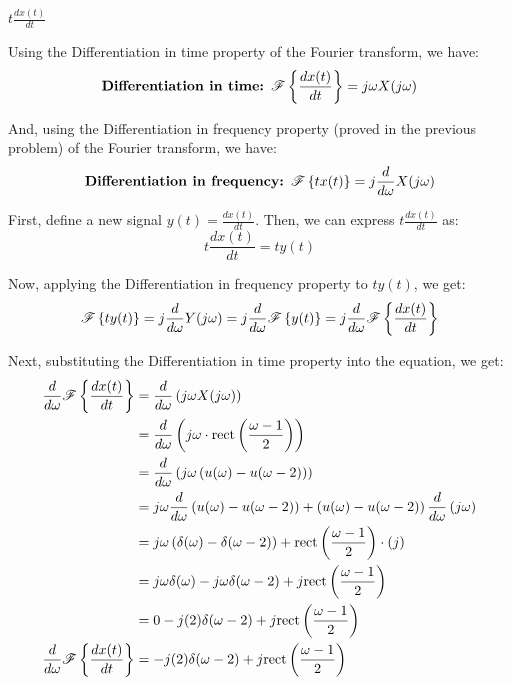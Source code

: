 \documentclass[a4paper, 10pt]{article}
\begin{document}
\newpage

\begin{tosubmit}
\begin{subproblems}[start=3]
    \item \( t \frac{d x(t)}{dt} \)
\end{subproblems}

\par\noindent\submitsolution
Using the Differentiation in time property of the Fourier transform, we have:
\[
    \textbf{Differentiation in time: } \mathscr{F} \left\{ \frac{d x(t)}{dt} \right\} = j\omega X(j\omega)
\]

And, using the Differentiation in frequency property (proved in the previous problem) of the Fourier transform, we have:
\[
    \textbf{Differentiation in frequency: } \mathscr{F} \left\{ t x(t) \right\} = j \frac{d}{d\omega} X(j\omega)
\]

First, define a new signal \( y(t) = \frac{d x(t)}{dt} \). Then, we can express \( t \frac{d x(t)}{dt} \) as:
\[
    t \frac{d x(t)}{dt} = t y(t)
\]

Now, applying the Differentiation in frequency property to \( t y(t) \), we get:
\[
    \mathscr{F} \left\{ t y(t) \right\} = j \frac{d}{d\omega} Y(j\omega) = j \frac{d}{d\omega} \mathscr{F} \left\{ y(t) \right\} = j \frac{d}{d\omega} \mathscr{F} \left\{ \frac{d x(t)}{dt} \right\}
\]

Next, substituting the Differentiation in time property into the equation, we get:
\begin{align*}  
    \frac{d}{d\omega} \mathscr{F} \left\{ \frac{d x(t)}{dt} \right\} &= \frac{d}{d\omega} \left( j\omega X(j\omega) \right) \\
    &= \frac{d}{d\omega} \left( j\omega \cdot \textrm{rect} \left( \frac{\omega - 1}{2} \right) \right) \\
    &= \frac{d}{d\omega} \left( j\omega \left( u(\omega) - u(\omega - 2) \right) \right) \\
    &= j\omega \frac{d}{d\omega} \left( u(\omega) - u(\omega - 2) \right) + \left( u(\omega) - u(\omega - 2) \right) \frac{d}{d\omega} \left( j\omega \right) \\
    &= j\omega \left( \delta(\omega) - \delta(\omega - 2) \right) + \textrm{rect} \left( \frac{\omega - 1}{2} \right) \cdot (j) \\
    &= j\omega \delta(\omega) - j\omega \delta(\omega - 2) + j \textrm{rect} \left( \frac{\omega - 1}{2} \right) \\
    &= 0 - j(2) \delta(\omega - 2) + j \textrm{rect} \left( \frac{\omega - 1}{2} \right) \\
    \frac{d}{d\omega} \mathscr{F} \left\{ \frac{d x(t)}{dt} \right\} &= - j(2) \delta(\omega - 2) + j \textrm{rect} \left( \frac{\omega - 1}{2} \right)
\end{align*}


\end{tosubmit}
\end{document}
